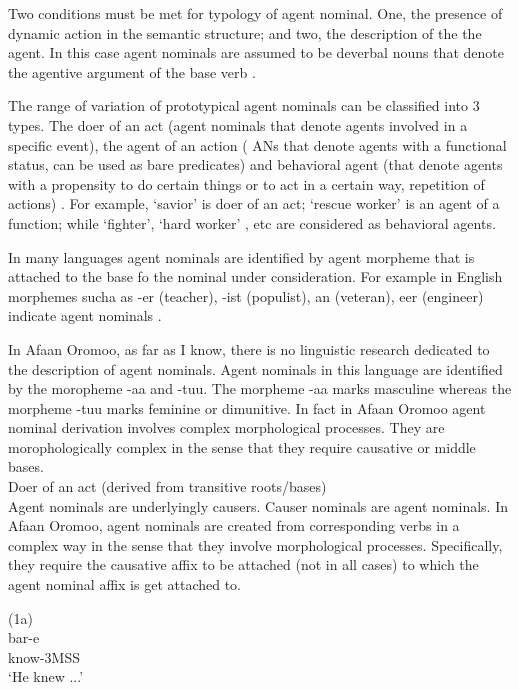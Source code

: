 \documentclass[11pt,a4paper]{article}
\begin{document}
Two conditions must be met for typology of agent nominal. One, the presence of dynamic action in the semantic structure; and two, the description of the the agent. In this case agent nominals are assumed to be deverbal nouns that denote the agentive argument of the base verb \cite[p-189-190]{huyghe2020s}.

The range of variation of prototypical agent nominals can be classified into 3 types. The doer of an act (agent nominals that denote agents involved in a specific event), the agent of an action ( ANs that denote agents with a functional status, can be used as bare predicates) and behavioral agent (that denote agents with a propensity to do certain things or to act in a certain way, repetition of actions) \cite[190-192]{huyghe2020s}. For example, ‘savior’  is doer of an act; ‘rescue worker’ is an agent of a function; while ‘fighter’, ‘hard worker’ , etc are considered as behavioral agents.

In many languages agent nominals are identified by agent morpheme that is attached to the base fo the nominal under consideration. For example in English morphemes sucha as -er (teacher), -ist (populist), an (veteran), eer (engineer) indicate agent nominals \cite[p-186]{huyghe2020s}.

In Afaan Oromoo, as far as I know, there is no linguistic research dedicated to the description of agent nominals. Agent nominals in this language are identified by the moropheme -aa and -tuu. The morpheme -aa marks masculine whereas the morpheme -tuu marks feminine or dimunitive. In fact in Afaan Oromoo agent nominal derivation involves complex morphological processes. They are morophologically complex in the sense that they require causative or middle bases. \\

Doer of an act (derived from transitive roots/bases)\\

Agent nominals are underlyingly causers. Causer nominals are agent nominals. In Afaan Oromoo, agent nominals are created from corresponding verbs in a complex way in the sense that they involve morphological processes. Specifically, they require the causative affix to be attached (not in all cases) to which the agent nominal affix is get attached to. 

(1a)\\
\indent	 bar-e\\
\indent know-3MSS\\
\indent	‘He knew ...'\\
\end{document}
